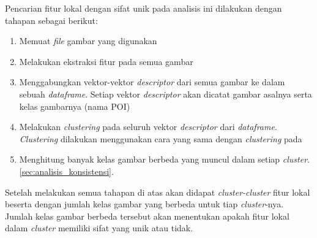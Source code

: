 Pencarian fitur lokal dengan sifat unik pada analisis ini dilakukan dengan tahapan sebagai berikut:
\begin{enumerate}
	\item Memuat \textit{file} gambar yang digunakan
	\item Melakukan ekstraksi fitur pada semua gambar
	\item Menggabungkan vektor-vektor \textit{descriptor} dari semua gambar ke dalam sebuah \textit{dataframe}. Setiap vektor \textit{descriptor} akan dicatat gambar asalnya serta kelas gambarnya (nama POI)
	\item Melakukan \textit{clustering} pada seluruh vektor \textit{descriptor} dari \textit{dataframe}. \textit{Clustering} dilakukan menggunakan cara yang sama dengan \textit{clustering} pada 
	\item Menghitung banyak kelas gambar berbeda yang muncul dalam setiap \textit{cluster}. \ref{sec:analisis_konsistensi}.
\end{enumerate}
Setelah melakukan semua tahapan di atas akan didapat \textit{cluster-cluster} fitur lokal beserta dengan jumlah kelas gambar yang berbeda untuk tiap \textit{cluster}-nya. Jumlah kelas gambar berbeda tersebut akan menentukan apakah fitur lokal dalam \textit{cluster} memiliki sifat yang unik atau tidak. 

